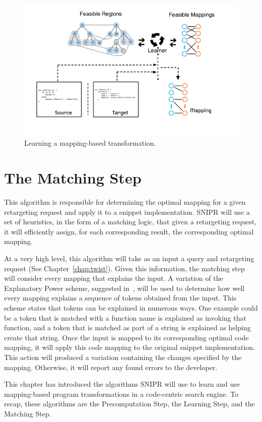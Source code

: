 \begin{figure}[!ht]
    \centering
    \includegraphics[width=\textwidth]{images/mappinggeneration}
    \caption{Learning a mapping-based transformation.}
    \label{fig:mappinggeneration}
\end{figure}

\section{The Matching Step}
\label{sec:precomputation}

This algorithm is responsible for determining the optimal mapping for a given retargeting request and apply it to a snippet implementation. SNIPR will use a set of heuristics, in the form of a matching logic, that given a retargeting request, it will efficiently assign, for each corresponding result, the corresponding optimal mapping. 

At a very high level, this algorithm will take as an input a query and retargeting request (See Chapter~\ref{chap:twist}). Given this information, the matching step will consider every mapping that explains the input. A variation of the Explanatory Power scheme, suggested in~\cite{Little:2008hr}, will be used to determine how well every mapping explains a sequence of tokens obtained from the input. This scheme states that tokens can be explained in numerous ways. One example could be a token that is matched with a function name is explained as invoking that function, and a token that is matched as part of a string is explained as helping create that string. Once the input is mapped to its corresponding optimal code mapping, it will apply this code mapping to the original snippet implementation. This action will produced a variation containing the changes specified by the mapping. Otherwise, it will report any found errors to the developer. 

This chapter has introduced the algorithms SNIPR will use to learn and use mapping-based program transformations in a code-centric search engine. To recap, these algorithms are the Precomputation Step, the Learning Step, and the Matching Step.
